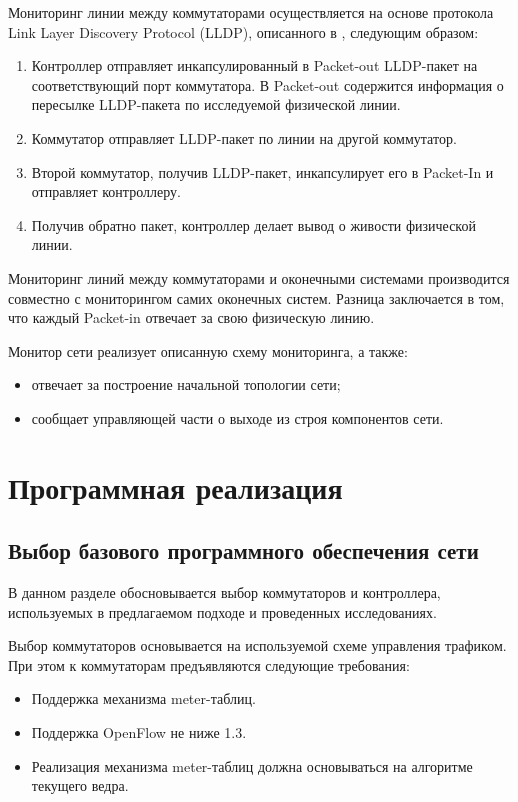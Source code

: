 \documentclass[12pt, a4paper]{article}
\begin{document}
Мониторинг линии между коммутаторами осуществляется на основе протокола Link Layer Discovery Protocol (LLDP), описанного в \cite{monitor2}, следующим образом:
\begin{enumerate}
	\item Контроллер отправляет инкапсулированный в Packet-out LLDP-пакет на соответствующий порт коммутатора. В Packet-out содержится информация о пересылке LLDP-пакета по исследуемой физической линии.
	\item Коммутатор отправляет LLDP-пакет по линии на другой коммутатор.
	\item Второй коммутатор, получив LLDP-пакет, инкапсулирует его в Packet-In и отправляет контроллеру.
	\item Получив обратно пакет, контроллер делает вывод о живости физической линии.
\end{enumerate}

Мониторинг линий между коммутаторами и оконечными системами производится совместно с мониторингом самих оконечных систем. Разница заключается в том, что каждый Packet-in отвечает за свою физическую линию.

Монитор сети реализует описанную схему мониторинга, а также:
\begin{itemize}
	\item отвечает за построение начальной топологии сети;
	\item сообщает управляющей части о выходе из строя компонентов сети.
\end{itemize}

\section{Программная реализация}
\subsection{Выбор базового программного обеспечения сети}

В данном разделе обосновывается выбор коммутаторов и контроллера, используемых в предлагаемом подходе и проведенных исследованиях.

Выбор коммутаторов основывается на используемой схеме управления трафиком. При этом к коммутаторам предъявляются следующие требования:
\begin{itemize}
	\item Поддержка механизма meter-таблиц.
	\item Поддержка OpenFlow не ниже 1.3.
	\item Реализация механизма meter-таблиц должна основываться на алгоритме текущего ведра.
\end{itemize}
\end{document}
